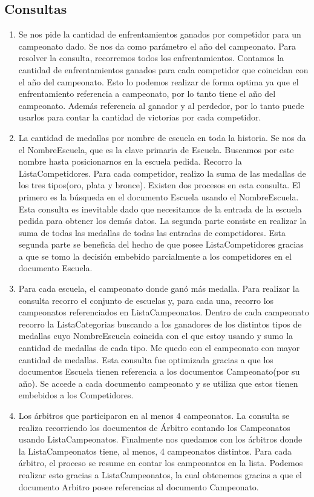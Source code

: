 \subsection{Consultas}
\begin{enumerate}
\item Se nos pide la cantidad de enfrentamientos ganados por competidor para un campeonato dado. Se nos da como parámetro
el año del campeonato. Para resolver la consulta, recorremos todos los enfrentamientos. Contamos la cantidad de
enfrentamientos ganados para cada competidor que coincidan con el año del campeonato. Esto lo podemos realizar de forma optima
ya que el enfrentamiento referencia a campeonato, por lo tanto tiene el año del campeonato. Además referencia al ganador y al
perdedor, por lo tanto puede usarlos para contar la cantidad de victorias por cada competidor.

\item La cantidad de medallas por nombre de escuela en toda la historia. Se nos da el NombreEscuela, que es la clave primaria de Escuela.
Buscamos por este nombre hasta posicionarnos en la escuela pedida. Recorro la ListaCompetidores. Para cada competidor, realizo la suma de
las medallas de los tres tipos(oro, plata y bronce). Existen dos procesos en esta consulta. El primero es la búsqueda en
el documento Escuela usando el NombreEscuela. Esta consulta es inevitable dado que necesitamos de la entrada de la escuela
pedida para obtener los demás datos. La segunda parte consiste en realizar la suma de todas las medallas de todas las entradas
de competidores. Esta segunda parte se beneficia del hecho de que posee ListaCompetidores gracias a que se tomo la decisión
embebido parcialmente a los competidores en el documento Escuela.

\item Para cada escuela, el campeonato donde ganó más medalla. Para realizar la consulta recorro el conjunto de
escuelas y, para cada una, recorro los campeonatos referenciados en ListaCampeonatos. Dentro de cada
campeonato recorro la ListaCategorias buscando a los ganadores de los distintos tipos de medallas cuyo NombreEscuela
coincida con el que estoy usando y sumo la cantidad de medallas de cada tipo. Me quedo con el campeonato con mayor
cantidad de medallas. Esta consulta fue optimizada gracias a que los documentos Escuela tienen referencia a los documentos
Campeonato(por su año). Se accede a cada documento campeonato y se utiliza que estos tienen embebidos a los Competidores.

\item Los árbitros que participaron en al menos 4 campeonatos. La consulta se realiza recorriendo los documentos
de Árbitro contando los Campeonatos usando ListaCampeonatos. Finalmente nos quedamos con los árbitros donde la ListaCampeonatos
tiene, al menos, 4 campeonatos distintos. Para cada árbitro, el proceso se resume en contar los campeonatos en la lista.
Podemos realizar esto gracias a ListaCampeonatos, la cual obtenemos gracias a que el documento Arbitro posee referencias
al documento Campeonato.


\end{enumerate}
